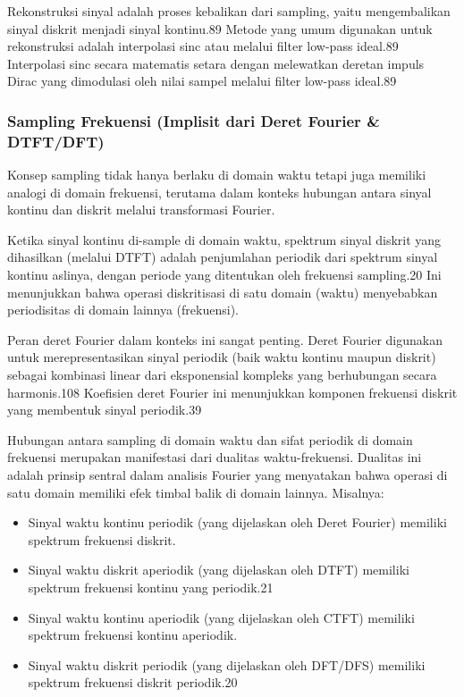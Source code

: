 \documentclass[
  letterpaper,
  DIV=11,
  numbers=noendperiod]{scrreprt}
\begin{document}
Rekonstruksi sinyal adalah proses kebalikan dari sampling, yaitu
mengembalikan sinyal diskrit menjadi sinyal kontinu.89 Metode yang umum
digunakan untuk rekonstruksi adalah interpolasi sinc atau melalui filter
low-pass ideal.89 Interpolasi sinc secara matematis setara dengan
melewatkan deretan impuls Dirac yang dimodulasi oleh nilai sampel
melalui filter low-pass ideal.89

\subsubsection{Sampling Frekuensi (Implisit dari Deret Fourier \&
DTFT/DFT)}\label{sampling-frekuensi-implisit-dari-deret-fourier-dtftdft}

Konsep sampling tidak hanya berlaku di domain waktu tetapi juga memiliki
analogi di domain frekuensi, terutama dalam konteks hubungan antara
sinyal kontinu dan diskrit melalui transformasi Fourier.

Ketika sinyal kontinu di-sample di domain waktu, spektrum sinyal diskrit
yang dihasilkan (melalui DTFT) adalah penjumlahan periodik dari spektrum
sinyal kontinu aslinya, dengan periode yang ditentukan oleh frekuensi
sampling.20 Ini menunjukkan bahwa operasi diskritisasi di satu domain
(waktu) menyebabkan periodisitas di domain lainnya (frekuensi).

Peran deret Fourier dalam konteks ini sangat penting. Deret Fourier
digunakan untuk merepresentasikan sinyal periodik (baik waktu kontinu
maupun diskrit) sebagai kombinasi linear dari eksponensial kompleks yang
berhubungan secara harmonis.108 Koefisien deret Fourier ini menunjukkan
komponen frekuensi diskrit yang membentuk sinyal periodik.39

Hubungan antara sampling di domain waktu dan sifat periodik di domain
frekuensi merupakan manifestasi dari dualitas waktu-frekuensi. Dualitas
ini adalah prinsip sentral dalam analisis Fourier yang menyatakan bahwa
operasi di satu domain memiliki efek timbal balik di domain lainnya.
Misalnya:

\begin{itemize}
\item
  Sinyal waktu kontinu periodik (yang dijelaskan oleh Deret Fourier)
  memiliki spektrum frekuensi diskrit.
\item
  Sinyal waktu diskrit aperiodik (yang dijelaskan oleh DTFT) memiliki
  spektrum frekuensi kontinu yang periodik.21
\item
  Sinyal waktu kontinu aperiodik (yang dijelaskan oleh CTFT) memiliki
  spektrum frekuensi kontinu aperiodik.
\item
  Sinyal waktu diskrit periodik (yang dijelaskan oleh DFT/DFS) memiliki
  spektrum frekuensi diskrit periodik.20
\end{itemize}
\end{document}
